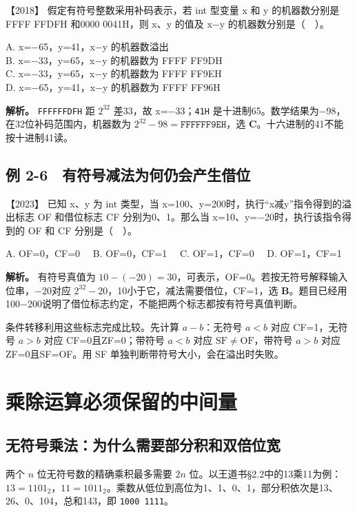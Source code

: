 \noindent{}【2018】 假定有符号整数采用补码表示，若 int 型变量 x 和 y 的机器数分别是 FFFF FFDFH 和0000 0041H，则 x、y 的值及 x−y 的机器数分别是（　）。

A. x=−65，y=41，x−y 的机器数溢出\\
B. x=−33，y=65，x−y 的机器数为 FFFF FF9DH\\
C. x=−33，y=65，x−y 的机器数为 FFFF FF9EH\\
D. x=−65，y=41，x−y 的机器数为 FFFF FF96H


\textbf{解析。} \allowbreak{}\texttt{FFFFFFDFH} 距 \(2^{32}\) 差33，故 x=−33；\allowbreak{}\texttt{41H} 是十进制65。数学结果为−98，在32位补码范围内，机器数为 \(2^{32}-98=\mathtt{FFFFFF9EH}\)，选 \textbf{C}。十六进制的41不能按十进制41读。

\subsection{例 2-6　有符号减法为何仍会产生借位}\label{co-ex2-6}

\noindent{}【2023】 已知 x、y 为 int 类型，当 x=100、y=200时，执行``x减y''指令得到的溢出标志 OF 和借位标志 CF 分别为0、1。那么当 x=10、y=−20时，执行该指令得到的 OF 和 CF 分别是（　）。

A. OF=0，CF=0　 B. OF=0，CF=1　 C. OF=1，CF=0　 D. OF=1，CF=1


\textbf{解析。} 有符号真值为 \(10-(-20)=30\)，可表示，OF=0。若按无符号解释输入位串，−20对应 \(2^{32}-20\)，10小于它，减法需要借位，CF=1，选 \textbf{B}。题目已经用100−200说明了借位标志约定，不能把两个标志都按有符号真值判断。

条件转移利用这些标志完成比较。先计算 \(a-b\)：无符号 \(a<b\) 对应 CF=1，无符号 \(a>b\) 对应 CF=0且ZF=0；带符号 \(a<b\) 对应 \(\mathrm{SF}\ne\mathrm{OF}\)，带符号 \(a>b\) 对应ZF=0且SF=OF。用 SF 单独判断带符号大小，会在溢出时失败。

\section{乘除运算必须保留的中间量}\label{co-02-06}

\subsection{无符号乘法：为什么需要部分积和双倍位宽}\label{co-c02-h150}

两个 \(n\) 位无符号数的精确乘积最多需要 \(2n\) 位。以王道书§2.2中的13乘11为例：\(13=1101_2\)，\(11=1011_2\)。乘数从低位到高位为1、1、0、1，部分积依次是13、26、0、104，总和143，即 \allowbreak{}\texttt{1000\ 1111}。

